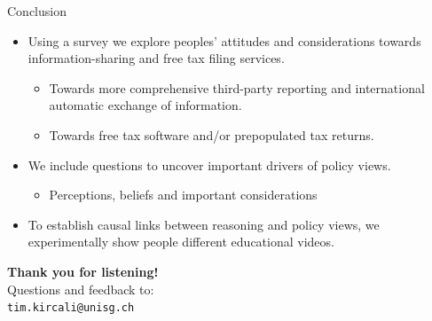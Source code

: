 \documentclass{beamer}
\begin{document}
\begin{frame}{Conclusion}
\begin{itemize}
\item Using a survey \alert{we explore peoples' attitudes and considerations towards information-sharing and free tax filing services.} 
\begin{itemize}
\item Towards more comprehensive third-party reporting and international automatic exchange of information.
\item Towards free tax software and/or prepopulated tax returns.
\end{itemize}
\vspace{0.5em}
\item We include questions to \alert{uncover important drivers of policy views.}
\begin{itemize}
    \item Perceptions, beliefs and important considerations 
\end{itemize}
\vspace{0.5em}
\item To \alert{establish causal links} between reasoning and policy views, we \alert{experimentally show} people different educational \alert{videos}.
\end{itemize}
\end{frame}

\begin{frame}
\centering
\vfill

{\Huge \textbf{Thank you for listening!}} \\[1.5em]

{\Large Questions and feedback to:} \\[0.5em]
\texttt{tim.kircali@unisg.ch}

\vfill
\end{frame}
\appendix
\end{document}
